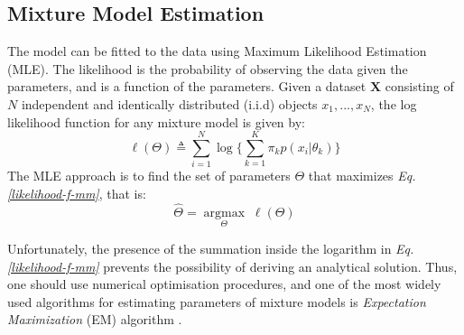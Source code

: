 \subsection{Mixture Model Estimation} \label{mixt-model-estimation-l-subsect}
The model can be fitted to the data using Maximum Likelihood Estimation (MLE). The likelihood is the probability of observing the data given the parameters, and is a function of the parameters. Given a dataset $\mathbf{X}$ consisting of $N$ independent and identically distributed (i.i.d) objects $x_{1}, ..., x_{N}$, the log likelihood function for any mixture model is given by:
\begin{equation} \label{likelihood-f-mm}
	\ell(\Theta) \triangleq \sum_{i=1}^{N} \log \bigg\lbrace \sum_{k=1}^{K}\pi_{k}p(x_{i}|\theta_{k})\bigg\rbrace
\end{equation}
The MLE approach is to find the set of parameters $\Theta$ that maximizes \emph{Eq. \ref{likelihood-f-mm}}, that is:
\begin{equation} \label{MLE-f-mm}
	\hat{\Theta} =  \underset{\Theta}{\operatorname{argmax}} \; \ell(\Theta)
\end{equation}

Unfortunately, the presence of the summation inside the logarithm in \emph{Eq. \ref{likelihood-f-mm}} prevents the possibility of deriving an analytical solution. Thus, one should use numerical optimisation procedures, and one of the most widely used algorithms for estimating parameters of mixture models is \emph{Expectation Maximization} (EM) algorithm \citep{Dempster1977}. 